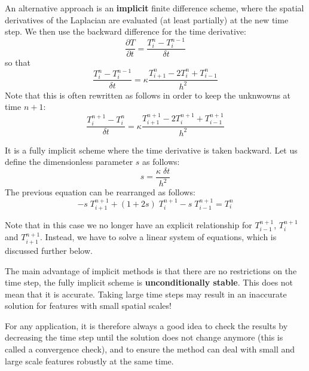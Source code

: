 \noindent An alternative approach is an {\bf implicit} finite difference scheme, where the spatial derivatives
of the Laplacian are evaluated (at least partially) at the new time step.
We then use the backward difference for the time derivative:
\begin{equation}
\frac{\partial T}{\partial t} = \frac{T_{i}^{n}-T_i^{n-1}}{\delta t} 
\end{equation}
so that
\begin{equation}
\frac{T_{i}^{n}-T_i^{n-1}}{\delta t} = \kappa \frac{T_{i+1}^n - 2T_i^n + T_{i-1}^n}{h^2}
\end{equation}
Note that this is often rewritten as follows in order to keep the unknwowns at time $n+1$:
\begin{equation}
\frac{T_{i}^{n+1}-T_i^{n}}{\delta t} = \kappa \frac{T_{i+1}^{n+1} - 2T_i^{n+1} + T_{i-1}^{n+1}}{h^2}
\end{equation}

It is a fully implicit scheme where the time derivative is taken backward.
Let us define the dimensionless parameter $s$ as follows:
\begin{equation}
s=\frac{\kappa \; \delta t}{h^2}
\end{equation}
The previous equation can be rearranged as follows:
\begin{equation}
\boxed{
-s \; T_{i+1}^{n+1} + (1+2s)\; T_{i}^{n+1} - s\; T_{i-1}^{n+1} = T_i^{n}
}
\end{equation}

\begin{center}

\end{center}



Note that in this case we no longer have an explicit relationship for 
$T^{n+1}_{i-1}$, $T^{n+1}_i$ and $T^{n+1}_{i+1}$.
Instead, we have to solve a {\color{olive}linear system of equations}, which is discussed further below.

The main advantage of implicit methods is that there are no restrictions on the time step,
the fully implicit scheme is {\bf unconditionally stable}.
This does not mean that it is accurate. 
Taking large time steps may result in an inaccurate solution for features with
small spatial scales!

For any application, it is therefore always a good idea to check the 
results by decreasing the time step
until the solution does not change anymore (this is called a {\color{olive}convergence check}), and 
to ensure the
method can deal with small and large scale features robustly at the same time.


